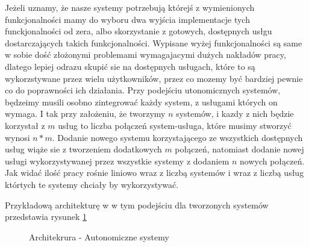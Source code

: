 Jeżeli uznamy, że nasze systemy potrzebują którejś z wymienionych funkcjonalności mamy do wyboru dwa wyjścia implementacje tych funckjonalności od zera, albo skorzystanie z gotowych, dostępnych usłgu dostarczających takich funkcjonalności. Wypisane wyżej funkcjonalności są same w sobie dość złożonymi problemami wymagajacymi dużych nakładów pracy, dlatego lepiej odrazu skupić sie na dostępnych usługach, które to są wykorzstywane przez wielu użytkowników, przez co mozemy być bardziej pewnie co do poprawności ich działania. Przy podejściu utonomicznych systemów, będzeimy musili osobno zintegrować każdy system, z usługami których on wymaga. I tak przy założeniu, że tworzymy \begin{math}n\end{math} systemów, i kazdy z nich będzie korzystał z \begin{math}m\end{math} usług to liczba połączeń system-usługa, które musimy stworzyć wynosi \begin{math}n*m\end{math}. Dodanie nowego systemu korzystającego ze wszystkich dostępnych usług wiąże sie z tworzeniem dodatkowych  \begin{math}m\end{math} połączeń, natomiast dodanie nowej usługi wykorzystywanej przez wszystkie systemy z dodaniem \begin{math}n\end{math} nowych połączeń. Jak widać ilość pracy rośnie liniowo wraz z liczbą systemów i wraz z liczbą usług którtych te systemy chciały by wykorzystywać.

 Przykładową architekturę w w tym podejściu dla tworzonych systemów przedstawia rysunek \ref{fig:autonomiczne_systemy}

\setlength\fboxsep{20pt}
\setlength\fboxrule{1pt}
\begin{figure}[!h]
	\centering
	\caption{Architekrura - Autonomiczne systemy}\label{fig:autonomiczne_systemy}
\end{figure}

